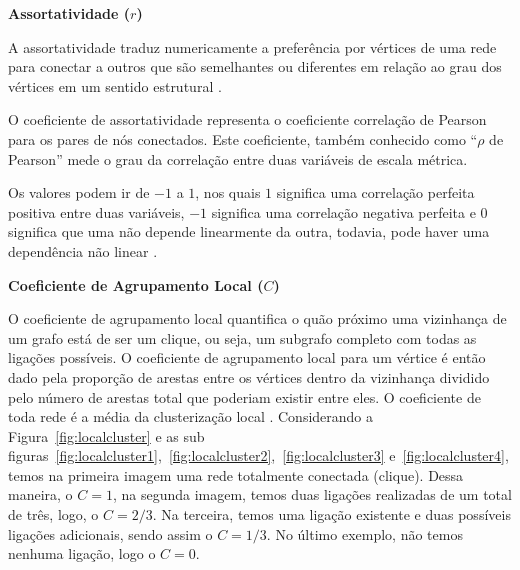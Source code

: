 \documentclass[
12pt,        %
oneside,     %
a4paper,     %
english,       %
brazil        %
%
%
]{ppgca}
\begin{document}
\textbf{Assortatividade ($r$)}

A assortatividade traduz numericamente a preferência por vértices de uma rede para conectar a outros que são semelhantes ou diferentes em relação ao grau dos vértices em um sentido estrutural \cite{Newman_2003}.

O coeficiente de assortatividade representa o coeficiente correlação de Pearson para os pares de nós conectados. Este coeficiente, também conhecido como ``$\rho$ de Pearson'' mede o grau da correlação entre duas variáveis de escala métrica.

Os valores podem ir de $-1$ a $1$, nos quais $1$ significa uma correlação perfeita positiva entre duas variáveis, $-1$ significa uma correlação negativa perfeita e $0$ significa que uma não depende linearmente da outra, todavia, pode haver uma dependência não linear \cite{Mukaka2012}.


\textbf{Coeficiente de Agrupamento Local ($C$)}

O coeficiente de agrupamento local quantifica o quão próximo uma vizinhança de um grafo está de ser um clique, ou seja, um subgrafo completo com todas as ligações possíveis. O coeficiente de agrupamento local para um vértice é então dado pela proporção de arestas entre os vértices dentro da vizinhança dividido pelo número de arestas total que poderiam existir entre eles. O coeficiente de toda rede é a média da clusterização local \cite{Holland1971, Watts1998}. Considerando a Figura~\ref{fig:localcluster} e as sub figuras~\ref{fig:localcluster1},~\ref{fig:localcluster2},~\ref{fig:localcluster3} e~\ref{fig:localcluster4}, temos na primeira imagem uma rede totalmente conectada (clique). Dessa maneira, o $C = 1$, na segunda imagem, temos duas ligações realizadas de um total de três, logo, o $C = 2/3$. Na terceira, temos uma ligação existente e duas possíveis ligações adicionais, sendo assim o $C = 1/3$. No último exemplo, não temos nenhuma ligação, logo o $C = 0$.
\end{document}
